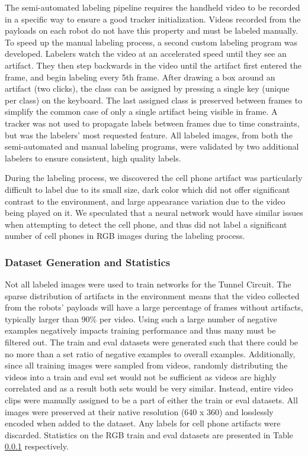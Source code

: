 The semi-automated labeling pipeline requires the handheld video to be recorded in a specific way to ensure a good tracker initialization. Videos recorded from the payloads on each robot do not have this property and must be labeled manually. To speed up the manual labeling process, a second custom labeling program was developed. Labelers watch the video at an accelerated speed until they see an artifact. They then step backwards in the video until the artifact first entered the frame, and begin labeling every 5th frame. After drawing a box around an artifact (two clicks), the class can be assigned by pressing a single key (unique per class) on the keyboard. The last assigned class is preserved between frames to simplify the common case of only a single artifact being visible in frame. A tracker was not used to propagate labels between frames due to time constraints, but was the labelers' most requested feature. All labeled images, from both the semi-automated and manual labeling programs, were validated by two additional labelers to ensure consistent, high quality labels.

During the labeling process, we discovered the cell phone artifact was particularly difficult to label due to its small size, dark color which did not offer significant contrast to the environment, and large appearance variation due to the video being played on it. We speculated that a neural network would have similar issues when attempting to detect the cell phone, and thus did not label a significant number of cell phones in RGB images during the labeling process.

\subsubsection{Dataset Generation and Statistics}

Not all labeled images were used to train networks for the Tunnel Circuit. The sparse distribution of artifacts in the environment means that the video collected from the robots' payloads will have a large percentage of frames without artifacts, typically larger than 90\% per video. Using such a large number of negative examples negatively impacts training performance and thus many must be filtered out. The train and eval datasets were generated such that there could be no more than a set ratio of negative examples to overall examples. Additionally, since all training images were sampled from videos, randomly distributing the videos into a train and eval set would not be sufficient as videos are highly correlated and as a result both sets would be very similar. Instead, entire video clips were manually assigned to be a part of either the train or eval datasets. All images were preserved at their native resolution (640 x 360) and losslessly encoded when added to the dataset. Any labels for cell phone artifacts were discarded. Statistics on the RGB train and eval datasets are presented in Table \ref{} respectively.

